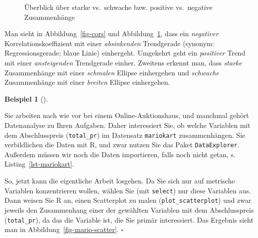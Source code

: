\documentclass[
  letterpaper,
  twoside,
  open=any]{scrbook}
\theoremstyle{definition}
\theoremstyle{definition}
\theoremstyle{definition}
\newtheorem{example}{Beispiel}[chapter]
\theoremstyle{remark}
\begin{document}
\begin{figure}


\caption{\label{fig-cors2}Überblick über starke vs.~schwache bzw.
positive vs.~negative Zusammenhänge}

\end{figure}%

Man sieht in Abbildung~\ref{fig-cors} und Abbildung~\ref{fig-cors2},
dass ein \emph{negativer} Korrelationskoeffizient mit einer
\emph{absinkenden} Trendgerade (synonym: Regressionsgerade; blaue Linie)
einhergeht. Umgekehrt geht ein \emph{positiver} Trend mit einer
\emph{ansteigenden} Trendgerade einher. Zweitens erkennt man, dass
\emph{starke} Zusammenhänge mit einer \emph{schmalen} Ellipse
einhergehen und \emph{schwache} Zusammenhänge mit einer \emph{breiten}
Ellipse einhergehen.

\begin{example}[]\protect\hypertarget{exm-scatter}{}\label{exm-scatter}

Sie arbeiten nach wie vor bei einem Online-Auktionshaus, und manchmal
gehört Datenanalyse zu Ihren Aufgaben. Daher interessiert Sie, ob welche
Variablen mit dem Abschlusspreis (\texttt{total\_pr}) im Datensatz
\texttt{mariokart} zusammenhängen. Sie verbildlichen die Daten mit R,
und zwar nutzen Sie das Paket \texttt{DataExplorer}. Außerdem müssen wir
noch die Daten importieren, falls noch nicht getan, s.
Listing~\ref{lst-mariokart}.

So, jetzt kann die eigentliche Arbeit losgehen. Da Sie sich nur auf
metrische Variablen konzentrieren wollen, wählen Sie (mit
\texttt{select}) nur diese Variablen aus. Dann weisen Sie R an, einen
Scatterplot zu malen (\texttt{plot\_scatterplot}) und zwar jeweils den
Zusammenhang einer der gewählten Variablen mit dem Abschlusspreis
(\texttt{total\_pr}), da das die Variable ist, die Sie primär
interessiert. Das Ergebnis sieht man in
Abbildung~\ref{fig-mario-scatter}. \(\square\)

\end{example}
\end{document}
